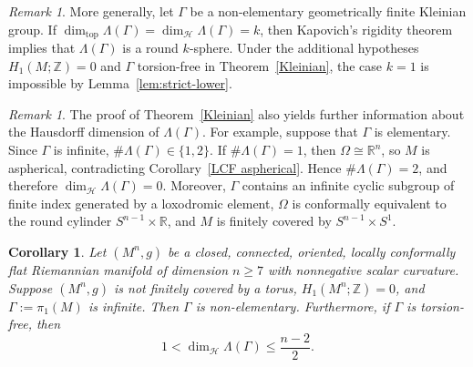 \documentclass[12pt,oneside,a4paper]{article}
\theoremstyle{mytheorem}
\newtheorem{corollary}[definition]{Corollary}
\theoremstyle{remark}
\newtheorem{remark}[definition]{Remark}
\theoremstyle{definition}
\begin{document}
\begin{remark}
More generally, let $\Gamma$ be a non-elementary geometrically finite
Kleinian group. If
$\dim_{\mathrm{top}}\Lambda(\Gamma)=\dim_{\mathcal H}\Lambda(\Gamma)=k$,
then
Kapovich's rigidity theorem \cite[Theorem~1.3]{MR2491697} implies that
$\Lambda(\Gamma)$ is a round $k$-sphere. Under the additional hypotheses
$H_1(M;\mathbb Z)=0$ and $\Gamma$ torsion-free in
Theorem~\ref{Kleinian}, the case $k=1$ is impossible by
Lemma~\ref{lem:strict-lower}.
\end{remark}




\begin{remark}
The proof of Theorem~\ref{Kleinian} also yields further information about
the Hausdorff dimension of \(\Lambda(\Gamma)\). For example, suppose that
\(\Gamma\) is elementary. Since \(\Gamma\) is infinite,
\(\#\Lambda(\Gamma)\in\{1,2\}\). If \(\#\Lambda(\Gamma)=1\), then
\(\Omega\cong\mathbb R^n\), so \(M\) is aspherical, contradicting
Corollary~\ref{LCF aspherical}. Hence \(\#\Lambda(\Gamma)=2\), and therefore
\(\dim_{\mathcal H}\Lambda(\Gamma)=0\). Moreover, \(\Gamma\) contains an
infinite cyclic subgroup of finite index generated by a loxodromic element,
\(\Omega\) is conformally equivalent to the round cylinder
\(S^{n-1}\times\mathbb R\), and \(M\) is finitely covered by
\(S^{n-1}\times S^1\).
\end{remark}






\begin{corollary}\label{nonnegative}
Let $(M^n,g)$ be a closed, connected, oriented, locally conformally flat
Riemannian manifold of dimension $n\geq7$ with nonnegative scalar curvature.
Suppose $(M^n,g)$ is not finitely covered by a torus,
\(H_1(M^n;\mathbb Z)=0\), and $\Gamma:=\pi_1(M)$ is infinite. Then $\Gamma$
is non-elementary. Furthermore, if \(\Gamma\) is torsion-free, then
\[
1<\dim_{\mathcal H}\Lambda(\Gamma)\leq\frac{n-2}{2}.
\]
\end{corollary}
\end{document}
